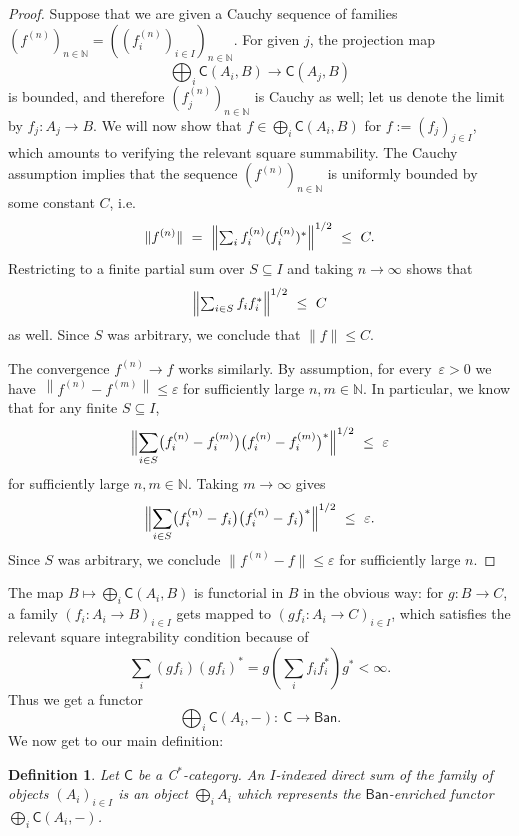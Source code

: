 \documentclass[reqno,T1,11pt]{amsproc}
\newcommand{\N}{\mathbb{N}}
\newcommand{\eps}{\varepsilon}
\newcommand{\cat}[1]{\mathsf{#1}}		%
\newcommand{\Ban}{\mathsf{Ban}}			%
\theoremstyle{plain}
\newtheorem{defn}[thm]{Definition}
\theoremstyle{remark}
\numberwithin{equation}{section}
\begin{document}

\begin{proof}
Suppose that we are given a Cauchy sequence of families $(f^{(n)})_{n\in\N} = ( ( f_i^{(n)} )_{i\in I} )_{n\in\N}$. For given $j$, the projection map
\[
	\bigoplus_i \cat{C}(A_i,B) \longrightarrow \cat{C}(A_j,B)	
\]
is bounded, and therefore $( f_j^{(n)} )_{n\in\N}$ is Cauchy as well; let us denote the limit by $f_j : A_j \to B$. We will now show that $f \in \bigoplus_i \cat{C}(A_i,B)$ for $f := (f_j)_{j\in I}$, which amounts to verifying the relevant square summability. The Cauchy assumption implies that the sequence $(f^{(n)})_{n\in\N}$ is uniformly bounded by some constant $C$, i.e.
\[
    \| f^{(n)} \| \ = \ 
	\Bigl\| \textstyle \sum_i f_i^{(n)} (f_i^{(n)})^* \Bigr\|^{1/2} \ \leq\  C.
\]
Restricting to a finite partial sum over $S\subseteq I$ and taking $n\to\infty$ shows that
\[
	\Bigl\| \textstyle \sum_{i\in S} f_i f_i^* \Bigr\|^{1/2} \ \leq\  C
\]
as well. Since $S$ was arbitrary, we conclude that $\| f \| \leq C$.

    The convergence $f^{(n)} \to f$ works similarly. By assumption, for every~$\eps > 0$ we have~$\left\| f^{(n)} - f^{(m)} \right\| \leq \eps$ for sufficiently large $n,m\in\N$. In particular, we know that for any finite $S \subseteq I$,
\[
	\Bigl\| \sum_{i\in S} \bigl(f_i^{(n)} - f_i^{(m)}\bigr) \bigl(f_i^{(n)} - f_i^{(m)}\bigr)^* \Bigr\|^{1/2} \ \leq\  \eps
\]
for sufficiently large $n,m\in\N$. Taking $m\to\infty$ gives
\[
	\Bigl\| \sum_{i\in S} \bigl(f_i^{(n)} - f_i\bigr) \bigl(f_i^{(n)} - f_i\bigr)^* \Bigr\|^{1/2} \ \leq \ \eps.
\]
Since $S$ was arbitrary, we conclude $\| f^{(n)} - f \|  \leq \eps$ for sufficiently large $n$.
\end{proof}

The map $B \mapsto \bigoplus_i \cat{C}(A_i,B)$ is functorial in $B$ in the obvious way: for $g : B \to C$, a family $(f_i : A_i \to B)_{i\in I}$ gets mapped to $(gf_i : A_i \to C)_{i\in I}$, which satisfies the relevant square integrability condition because of
\[
	\sum_i (g f_i)(g f_i)^* = g \left( \sum_i f_i f_i^* \right) g^* < \infty.
\]
Thus we get a functor
\[
	\bigoplus_i \cat{C}(A_i,-)  \colon \  \cat{C} \to \Ban.
\]
We now get to our main definition:

\begin{defn}
\label{directsumdef}
Let $\cat{C}$ be a C$^*$-category. An \emph{$I$-indexed direct sum} of the family of objects $(A_i)_{i\in I}$ is an object $\bigoplus_i A_i$ which represents the $\Ban$-enriched functor $\bigoplus_i \cat{C}(A_i,-)$.
\end{defn}
\end{document}

